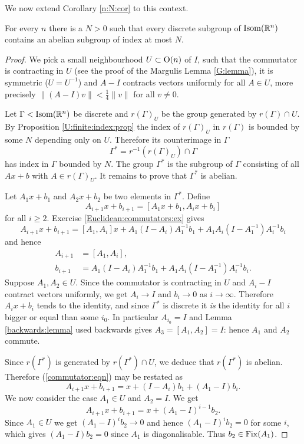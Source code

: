 We now extend Corollary \ref{n:N:cor} to this context.

\begin{teo} \label{discrete:virtual:abelian:teo}
For every $n$ there is a $N>0$ such that every discrete subgroup of ${\rm Isom}(\mathbb{R}^n)$ contains an abelian subgroup of index at most $N$.
\end{teo}
\begin{proof}
We pick a small neighbourhood $U \subset {\rm O}(n)$ of $I$, such that
the commutator is contracting in $U$ (see the proof of the Margulis Lemma \ref{G:lemma}), it is symmetric ($U=U^{-1}$) and $A-I$ contracts vectors uniformly for all $A\in U$, more precisely $\|(A-I)v\| < \frac 14\|v\|$ for all $v\neq 0$.

Let $\Gamma < {\rm Isom}(\mathbb{R}^n)$ be discrete and $r(\Gamma)_U$ be the group generated by $r(\Gamma)\cap U$. By Proposition \ref{U:finite:index:prop} the index of $r(\Gamma)_U$ in $r(\Gamma)$ is bounded by some $N$ depending only on $U$. Therefore its counterimage in $\Gamma$
$$\Gamma^* = r^{-1}(r(\Gamma)_U) \cap \Gamma$$ 
has index in $\Gamma$ bounded by $N$. The group $\Gamma^*$ is the subgroup of $\Gamma$ consisting of all $Ax+b$ with $A\in r(\Gamma)_U$. 
It remains to prove that $\Gamma^*$ is abelian.

Let $A_1x+b_1$ and $A_2x +b_2$ be two elements in $\Gamma^*$. Define
\begin{equation*} 
A_{i+1}x+b_{i+1} = [A_1x+b_1, A_ix+b_i]
\end{equation*}
for all $i\geqslant 2$. Exercise \ref{Euclidean:commutators:ex} gives
\begin{equation} \label{commutator:eqn}
A_{i+1}x+b_{i+1} = [A_1,A_i]x + A_1(I-A_i)A_1^{-1}b_1 + A_1A_i(I-A_1^{-1})A_i^{-1}b_i
\end{equation}
and hence
\begin{align*}
A_{i+1} & = [A_1,A_i], \\
 b_{i+1} & = A_1(I-A_i)A_1^{-1}b_1 + A_1A_i(I-A_1^{-1})A_i^{-1}b_i.
\end{align*}
Suppose $A_1, A_2 \in U$. Since the commutator is contracting in $U$ and $A_i-I$ contract vectors uniformly, we get $A_{i} \to I$ and $b_i\to 0$ as $i\to \infty$. Therefore $A_ix+b_i$ tends to the identity, and since $\Gamma^*$ is discrete it \emph{is} the identity for all $i$ bigger or equal than some $i_0$. In particular $A_{i_0} = I$ and Lemma \ref{backwards:lemma} used backwards gives $A_3=[A_1,A_2]=I$: hence $A_1$ and $A_2$ commute. 

Since $r(\Gamma^*)$ is generated by $r(\Gamma^*)\cap U$,
we deduce that $r(\Gamma^*)$ is abelian. Therefore (\ref{commutator:eqn}) may be restated as
\begin{equation} \label{simplified:commutator:eqn}
A_{i+1}x+b_{i+1} = x + (I-A_i)b_1 + (A_1 - I)b_i.
\end{equation}
We now consider the case $A_1 \in U$ and $A_2=I$. We get
$$A_{i+1}x+b_{i+1} = x + (A_1-I)^{i-1} b_2.$$
Since $A_1\in U$ we get $(A_1-I)^i b_2 \to 0$ and hence $(A_1-I)^ib_2=0$ for some $i$, which gives $(A_1-I)b_2=0$ since $A_1$ is diagonalisable. Thus $b_2 \in {\rm Fix} (A_1)$.


\end{proof}

